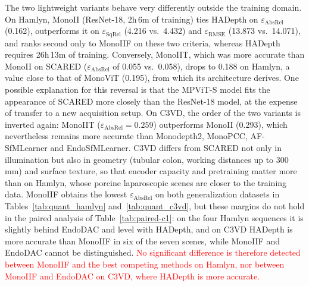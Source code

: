 \documentclass[a4paper,fleqn]{cas-dc}
\begin{document}
{
The two lightweight variants behave very differently outside the training domain. On Hamlyn, MonoII (ResNet-18, 2h\,6m of training) ties HADepth on $\varepsilon_\textrm{AbsRel}$ (0.162), outperforms it on $\varepsilon_\textrm{SqRel}$ (4.216 vs.\ 4.432) and $\varepsilon_\textrm{RMSE}$ (13.873 vs.\ 14.071), and ranks second only to MonoIIF on these two criteria, whereas HADepth requires 26h\,13m of training. Conversely, MonoIIT, which was more accurate than MonoII on SCARED ($\varepsilon_\textrm{AbsRel}$ of 0.055 vs.\ 0.058), drops to 0.188 on Hamlyn, a value close to that of MonoViT (0.195), from which its architecture derives. One possible explanation for this reversal is that the MPViT-S model fits the appearance of SCARED more closely than the ResNet-18 model, at the expense of transfer to a new acquisition setup.
On C3VD, the order of the two variants is inverted again: MonoIIT ($\varepsilon_\textrm{AbsRel}=0.259$) outperforms MonoII (0.293), which nevertheless remains more accurate than Monodepth2, MonoPCC, AF-SfMLearner and EndoSfMLearner. C3VD differs from SCARED not only in illumination but also in geometry (tubular colon, working distances up to 300\,mm) and surface texture, so that encoder capacity and pretraining matter more than on Hamlyn, whose porcine laparoscopic scenes are closer to the training data. MonoIIF obtains the lowest $\varepsilon_\textrm{AbsRel}$ on both generalization datasets in Tables~\ref{tab:quant_hamlyn} and~\ref{tab:quant_c3vd}, but these margins do not hold in the paired analysis of Table~\ref{tab:paired-c1}: on the four Hamlyn sequences it is slightly behind EndoDAC and level with HADepth, and on C3VD HADepth is more accurate than MonoIIF in six of the seven scenes, while MonoIIF and EndoDAC cannot be distinguished. \textcolor{red}{No significant difference is therefore detected between MonoIIF and the best competing methods on Hamlyn, nor between MonoIIF and EndoDAC on C3VD, where HADepth is more accurate.}}
\end{document}
